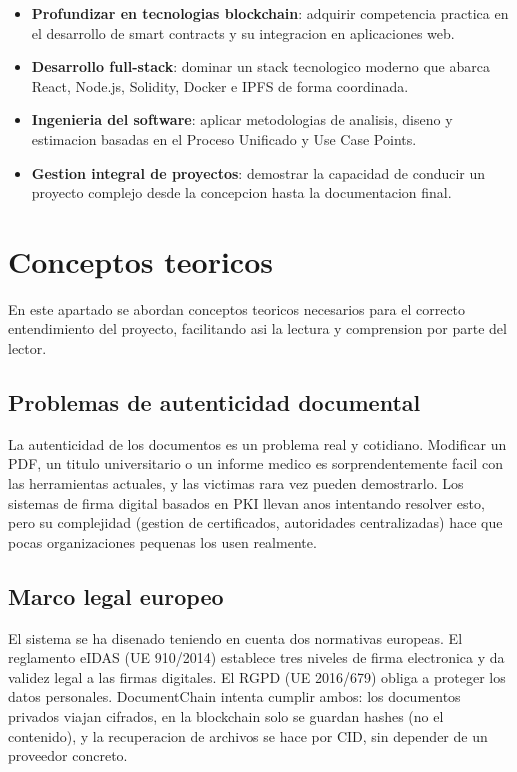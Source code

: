 \documentclass[11pt, a4paper]{article}
\begin{document}
\begin{itemize}
    \item \textbf{Profundizar en tecnologias blockchain}: adquirir competencia practica en el desarrollo de smart contracts y su integracion en aplicaciones web.
    \item \textbf{Desarrollo full-stack}: dominar un stack tecnologico moderno que abarca React, Node.js, Solidity, Docker e IPFS de forma coordinada.
    \item \textbf{Ingenieria del software}: aplicar metodologias de analisis, diseno y estimacion basadas en el Proceso Unificado y Use Case Points.
    \item \textbf{Gestion integral de proyectos}: demostrar la capacidad de conducir un proyecto complejo desde la concepcion hasta la documentacion final.
\end{itemize}

\section{Conceptos teoricos}

En este apartado se abordan conceptos teoricos necesarios para el correcto entendimiento del proyecto, facilitando asi la lectura y comprension por parte del lector.

\subsection{Problemas de autenticidad documental}

La autenticidad de los documentos es un problema real y cotidiano. Modificar un PDF, un titulo universitario o un informe medico es sorprendentemente facil con las herramientas actuales, y las victimas rara vez pueden demostrarlo. Los sistemas de firma digital basados en PKI llevan anos intentando resolver esto, pero su complejidad (gestion de certificados, autoridades centralizadas) hace que pocas organizaciones pequenas los usen realmente.

\subsection{Marco legal europeo}

El sistema se ha disenado teniendo en cuenta dos normativas europeas. El reglamento eIDAS (UE 910/2014) establece tres niveles de firma electronica y da validez legal a las firmas digitales. El RGPD (UE 2016/679) obliga a proteger los datos personales. DocumentChain intenta cumplir ambos: los documentos privados viajan cifrados, en la blockchain solo se guardan hashes (no el contenido), y la recuperacion de archivos se hace por CID, sin depender de un proveedor concreto.
\end{document}

